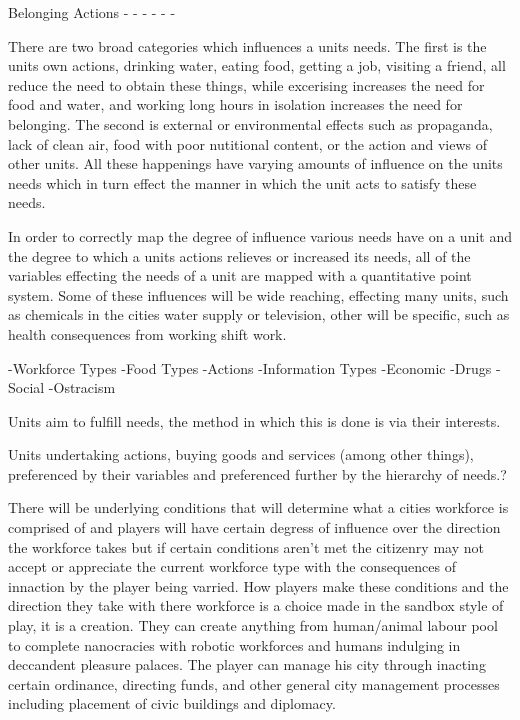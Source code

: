 Belonging Actions
-
-
-
-
-
-


There are two broad categories which influences a units needs. The first is the units own actions, drinking water, eating food, getting a job, visiting a friend, all reduce the need to obtain these things, while excerising increases the need for food and water, and working long hours in isolation increases the need for belonging. The second is external or environmental effects such as propaganda, lack of clean air, food with poor nutitional content, or the action and views of other units. All these happenings have varying amounts of influence on the units needs which in turn effect the manner in which the unit acts to satisfy these needs.

In order to correctly map the degree of influence various needs have on a unit and the degree to which a units actions relieves or increased its needs, all of the variables effecting the needs of a unit are mapped with a quantitative point system. Some of these influences will be wide reaching, effecting many units, such as chemicals in the cities water supply or television, other will be specific, such as health consequences from working shift work. 


-Workforce Types
-Food Types
-Actions
-Information Types
-Economic 
-Drugs
-Social
-Ostracism



%
%
%
%
%
%
%





Units aim to fulfill needs, the method in which this is done is via their interests.

Units undertaking actions, buying goods and services (among other things), preferenced by their variables and preferenced further by the hierarchy of needs.?






There will be underlying conditions that will determine what a cities workforce is comprised of and players will have certain degress of influence over the direction the workforce takes but if certain conditions aren't met the citizenry may not accept or appreciate the current workforce type with the consequences of innaction by the player being varried. How players make these conditions and the direction they take with there workforce is a choice made in the sandbox style of play, it is a creation. They can create anything from human/animal labour pool to complete nanocracies with robotic workforces and humans indulging in deccandent pleasure palaces. The player can manage his city through inacting certain ordinance, directing funds, and other general city management processes including placement of civic buildings and diplomacy. 
